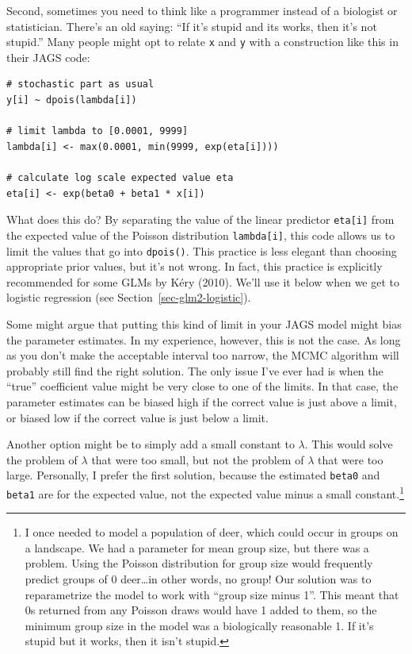 \documentclass[
  13,
  letterpaper,
]{report}
\begin{document}
Second, sometimes you need to think like a programmer instead of a
biologist or statistician. There's an old saying: ``If it's stupid and
its works, then it's not stupid.'' Many people might opt to relate
\texttt{x} and \texttt{y} with a construction like this in their JAGS
code:

\begin{verbatim}
# stochastic part as usual
y[i] ~ dpois(lambda[i])

# limit lambda to [0.0001, 9999]
lambda[i] <- max(0.0001, min(9999, exp(eta[i])))

# calculate log scale expected value eta
eta[i] <- exp(beta0 + beta1 * x[i])
\end{verbatim}

What does this do? By separating the value of the linear predictor
\texttt{eta{[}i{]}} from the expected value of the Poisson distribution
\texttt{lambda{[}i{]}}, this code allows us to limit the values that go
into \texttt{dpois()}. This practice is less elegant than choosing
appropriate prior values, but it's not wrong. In fact, this practice is
explicitly recommended for some GLMs by Kéry (2010). We'll use it below
when we get to logistic regression (see
Section~\ref{sec-glm2-logistic}).

Some might argue that putting this kind of limit in your JAGS model
might bias the parameter estimates. In my experience, however, this is
not the case. As long as you don't make the acceptable interval too
narrow, the MCMC algorithm will probably still find the right solution.
The only issue I've ever had is when the ``true'' coefficient value
might be very close to one of the limits. In that case, the parameter
estimates can be biased high if the correct value is just above a limit,
or biased low if the correct value is just below a limit.

Another option might be to simply add a small constant to \(\lambda\).
This would solve the problem of \(\lambda\) that were too small, but not
the problem of \(\lambda\) that were too large. Personally, I prefer the
first solution, because the estimated \texttt{beta0} and \texttt{beta1}
are for the expected value, not the expected value minus a small
constant.\footnote{I once needed to model a population of deer, which
  could occur in groups on a landscape. We had a parameter for mean
  group size, but there was a problem. Using the Poisson distribution
  for group size would frequently predict groups of 0 deer\ldots in
  other words, no group! Our solution was to reparametrize the model to
  work with ``group size minus 1''. This meant that 0s returned from any
  Poisson draws would have 1 added to them, so the minimum group size in
  the model was a biologically reasonable 1. If it's stupid but it
  works, then it isn't stupid.}
\end{document}
